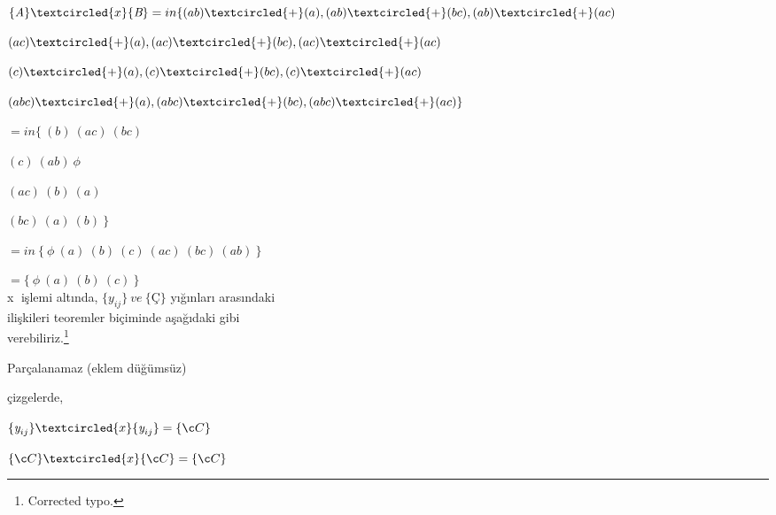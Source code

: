 \documentclass[11pt]{amsbook}
\begin{document}

$\{\textit{A}\}\textcircled{x}\{\textit{B}\}= in \{ (ab)\textcircled{+}(a),(ab)\textcircled{+}(bc),(ab)\textcircled{+}(ac)$\par
\hspace{2.5cm} $(ac)\textcircled{+}(a),(ac)\textcircled{+}(bc),(ac)\textcircled{+}(ac)$\par
\hspace{3cm} $(c)\textcircled{+}(a),(c)\textcircled{+}(bc),(c)\textcircled{+}(ac)$\par
\hspace{2.5cm} $(abc)\textcircled{+}(a),(abc)\textcircled{+}(bc),(abc)\textcircled{+}(ac) \}$\par

\hspace{1.8cm} $= in \{\ (b)\ (ac)\ (bc)$\par
\hspace{2.9cm} $(c)\ (ab)\ \phi $\par
\hspace{2.9cm} $(ac)\ (b)\ (a)$\par
\hspace{2.9cm} $(bc)\ (a)\ (b)\ \}$\par

\hspace{1.8cm} $=in\ \{\ \phi\ (a)\ (b)\ (c)\ (ac)\ (bc)\ (ab)\ \}$

\hspace{1.8cm} $=\{\ \phi\ (a)\ (b)\ (c)\ \}$\\

\textcircled{x} işlemi altında, $\{\textit{y}_{ij}\}\ ve\ \{Ç\}$ yığınları arasındaki\\
ilişkileri teoremler biçiminde aşağıdaki gibi\\
verebiliriz.\footnote{Corrected typo.}\\

\begin{theorem}
    
    Parçalanamaz (eklem düğümsüz)\par
    \hspace{2cm} çizgelerde,\par
    \hspace{2cm} $\{\textit{y}_{ij}\}\textcircled{x}\{\textit{y}_{ij}\}=\{Ç\}$
    
\end{theorem}

\begin{theorem}
    
    $\{Ç\}\textcircled{x}\{Ç\}=\{Ç\}$
    
\end{theorem}
\end{document}
